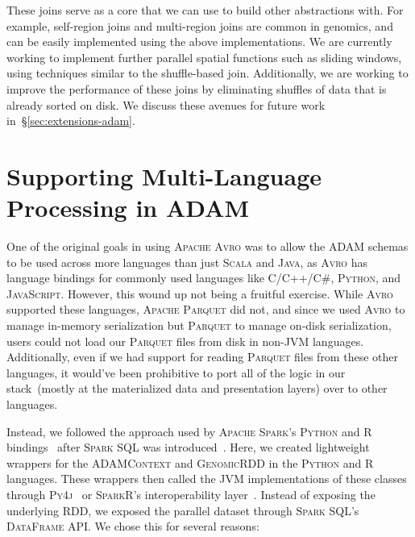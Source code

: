 \documentclass[phd]{ucbthesis}
\begin{document}
These joins serve as a core that we can use to build other abstractions with.
For example, self-region joins and multi-region joins are common in genomics,
and can be easily implemented using the above implementations. We are currently
working to implement further parallel spatial functions such as sliding windows,
using techniques similar to the shuffle-based join. Additionally, we are working
to improve the performance of these joins by eliminating shuffles of data that
is already sorted on disk. We discuss these avenues for future work
in~\S\ref{sec:extensions-adam}.

\section{Supporting Multi-Language Processing in \textsc{ADAM}}
\label{sec:multi-language}

One of the original goals in using \textsc{Apache Avro} was to allow the
\textsc{ADAM} schemas to be used across more languages than just \textsc{Scala}
and \textsc{Java}, as \textsc{Avro} has language bindings for commonly used
languages like C/C++/C\#, \textsc{Python}, and \textsc{JavaScript}. However,
this wound up not being a fruitful exercise. While \textsc{Avro} supported these
languages, \textsc{Apache Parquet} did not, and since we used \textsc{Avro} to
manage in-memory serialization but \textsc{Parquet} to manage on-disk
serialization, users could not load our \textsc{Parquet} files from disk in
non-JVM languages. Additionally, even if we had support for reading
\textsc{Parquet} files from these other languages, it would've been prohibitive
to port all of the logic in our stack~(mostly at the materialized data and
presentation layers) over to other languages.

Instead, we followed the approach used by \textsc{Apache Spark}'s
\textsc{Python} and R bindings~\cite{venkataraman16} after \textsc{Spark SQL}
was introduced~\cite{armbrust15}. Here, we created lightweight wrappers for
the \textsc{ADAMContext} and \textsc{GenomicRDD} in the \textsc{Python} and
R languages. These wrappers then called the JVM implementations of these classes
through \textsc{Py4j}~\cite{py4j} or \textsc{SparkR}'s interoperability
layer~\cite{venkataraman16}. Instead of exposing the underlying RDD, we exposed
the parallel dataset through \textsc{Spark SQL}'s \textsc{DataFrame} API. We
chose this for several reasons:
\end{document}
